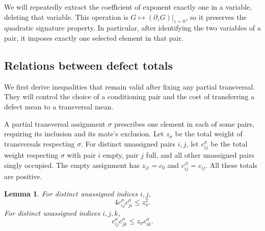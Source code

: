 \documentclass[11pt]{article}
\newtheorem{lemma}[theorem]{Lemma}
\theoremstyle{definition}
\begin{document}
We will repeatedly extract the coefficient of exponent exactly one in a
variable, deleting that variable.  This operation is
$G\mapsto(\partial_zG)|_{z=0}$, so it preserves the quadratic signature
property.  In particular, after identifying the two variables of a pair,
it imposes exactly one selected element in that pair.

\subsection{Relations between defect totals}

We first derive inequalities that remain valid after fixing any partial
transversal.  They will control the choice of a conditioning pair and
the cost of transferring a defect mean to a transversal mean.

A partial transversal assignment $\sigma$ prescribes one element in each of
some pairs, requiring its inclusion and its mate's exclusion.  Let $z_{\sigma}$
be the total weight of transversals respecting $\sigma$.  For distinct
unassigned pairs $i,j$, let $c^{\sigma}_{ij}$ be the total weight respecting $\sigma$
with pair $i$ empty, pair $j$ full, and all other unassigned pairs singly
occupied.  The empty assignment has $z_\varnothing=c_0$ and
$c^\varnothing_{ij}=c_{ij}$.  All these totals are positive.

\begin{lemma}\label{lem:coefficient}
For distinct unassigned indices $i,j$,
\begin{equation}\label{eq:coefficientpair}
 4c^{\sigma}_{ij}c^{\sigma}_{ji}\le z_{\sigma}^2.
\end{equation}
For distinct unassigned indices $i,j,k$,
\begin{equation}\label{eq:coefficient}
 c^{\sigma}_{ij}c^{\sigma}_{jk}\le z_{\sigma}c^{\sigma}_{ik}.
\end{equation}
\end{lemma}
\end{document}
